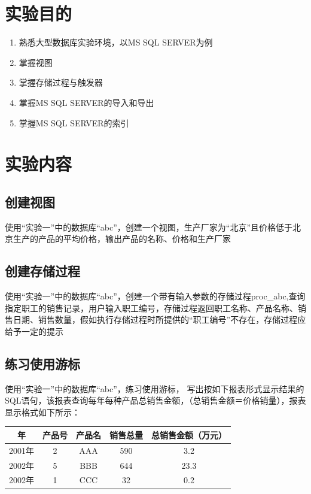 \documentclass[UTF8,12pt]{article}
\begin{document}
\begin{center}
    \tableofcontents
\end{center}
\newpage

\section{实验目的}
\begin{enumerate}
    \item 熟悉大型数据库实验环境，以MS SQL SERVER为例
    \item 掌握视图
    \item 掌握存储过程与触发器
    \item 掌握MS SQL SERVER的导入和导出
    \item 掌握MS SQL SERVER的索引
\end{enumerate}

\section{实验内容}
\subsection{创建视图}
使用“实验一”中的数据库“abc”，创建一个视图，生产厂家为“北京”且价格低于北京生产的产品的平均价格，输出产品的名称、价格和生产厂家

\subsection{创建存储过程}
使用“实验一”中的数据库“abc”，创建一个带有输入参数的存储过程proc\_abc,查询指定职工的销售记录，用户输入职工编号，存储过程返回职工名称、产品名称、销售日期、销售数量，假如执行存储过程时所提供的“职工编号”不存在，存储过程应给予一定的提示

\subsection{练习使用游标}
使用“实验一”中的数据库“abc”，练习使用游标， 写出按如下报表形式显示结果的SQL语句，该报表查询每年每种产品总销售金额，（总销售金额＝价格\*销量），报表显示格式如下所示：

\begin{tabular}{ccccc}
    \toprule
    年&产品号&产品名&销售总量&总销售金额（万元）\\
    \midrule
    2001年&2&AAA&590&3.2\\
    2002年&5&BBB&644&23.3\\
    2002年&1&CCC&32&0.2\\
    \bottomrule
\end{tabular}
\end{document}
